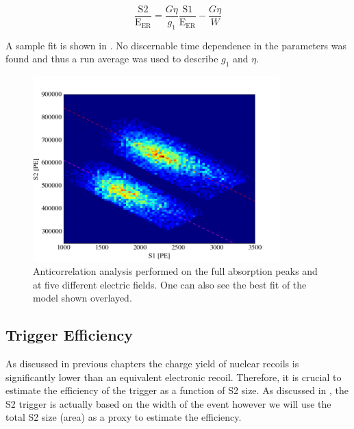  \begin{equation}
        \label{eqn:nerix_anticorrelation_line}
        \frac{\textrm{S2}}{\textrm{E}_{\textrm{ER}}} = \frac{G \eta}{g_1} \frac{\textrm{S1}}{\textrm{E}_{\textrm{ER}}} - \frac{G \eta}{W}
\end{equation}

A sample fit is shown in .  No discernable time dependence in the parameters was found and thus a run average was used to describe $g_1$ and $\eta$.

\begin{figure}[t]
        \centering
	\includegraphics[width=0.85\textwidth]{nerix_anticorrelation}
	\caption{Anticorrelation analysis performed on the full absorption peaks \cesium{} and \sodium{} at five different electric fields.  One can also see the best fit of the model shown overlayed.}
	\label{fig:nerix_anticorrelation}
\end{figure}


\subsection{Trigger Efficiency}
\label{sec:nerix_trig_efficiency}

As discussed in previous chapters the charge yield of nuclear recoils is significantly lower than an equivalent electronic recoil.  Therefore, it is crucial to estimate the efficiency of the trigger as a function of S2 size.  As discussed in , the S2 trigger is actually based on the width of the event however we will use the total S2 size (area) as a proxy to estimate the efficiency.

